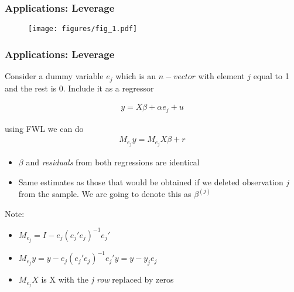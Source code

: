 \documentclass[
  shownotes,
  xcolor={svgnames},
  hyperref={colorlinks,citecolor=DarkBlue,linkcolor=DarkRed,urlcolor=DarkBlue}
  ]{beamer}
\begin{document}
\begin{frame}
\frametitle{Applications: Leverage}

\begin{figure}[H] \centering
  \centering
  \texttt{[image: figures/fig\_1.pdf]}
  \\
  \tiny
\end{figure}


\end{frame}

\begin{frame}
\frametitle{Applications: Leverage}

Consider a dummy variable $e_j$ which is an $n-vector$ with element $j$ equal to 1 and the rest is 0. 
Include it as a regressor

\begin{align}
y =X\beta+\alpha e_j +u
\end{align}

using FWL we can do 
\begin{align}
M_{e_j} y =M_{e_j} X\beta + r
\end{align}

\begin{itemize}
  \footnotesize
\item $\beta$ and {\it residuals} from both regressions are identical
\item Same estimates as those that would be obtained if we deleted observation $j$ from the sample. We are going to denote this as $\beta^{(j)}$
\end{itemize}

Note: 
\begin{itemize}
\item $M_{e_j}=I-e_j(e_j'e_j)^{-1}e_j'$
\item  $M_{e_j} y = y-e_j(e_j'e_j)^{-1}e_j' y= y-y_je_j$
\item  $M_{e_j} X$ is X with the {\it j row } replaced by zeros
\end{itemize}


\end{frame}
\end{document}
